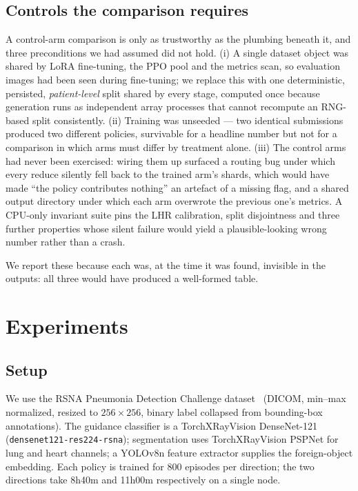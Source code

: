\documentclass[10pt,twocolumn,letterpaper]{article}
\begin{document}
\subsection{Controls the comparison requires}
A control-arm comparison is only as trustworthy as the plumbing beneath
it, and three preconditions we had assumed did not hold. (i) A single
dataset object was shared by LoRA fine-tuning, the PPO pool and the
metrics scan, so evaluation images had been seen during fine-tuning; we
replace this with one deterministic, persisted, \emph{patient-level}
split shared by every stage, computed once because generation runs as
independent array processes that cannot recompute an RNG-based split
consistently. (ii) Training was unseeded --- two identical submissions
produced two different policies, survivable for a headline number but
not for a comparison in which arms must differ by treatment alone.
(iii) The control arms had never been exercised: wiring them up surfaced
a routing bug under which every reduce silently fell back to the trained
arm's shards, which would have made ``the policy contributes nothing''
an artefact of a missing flag, and a shared output directory under which
each arm overwrote the previous one's metrics. A CPU-only invariant
suite pins the LHR calibration, split disjointness and three further
properties whose silent failure would yield a plausible-looking wrong
number rather than a crash.

We report these because each was, at the time it was found, invisible in
the outputs: all three would have produced a well-formed table.

\section{Experiments}
\label{sec:experiments}

\subsection{Setup}
We use the RSNA Pneumonia Detection Challenge dataset~\cite{rsna} (DICOM,
min--max normalized, resized to $256\times256$, binary label collapsed
from bounding-box annotations). The guidance classifier is a
TorchXRayVision DenseNet-121 (\texttt{densenet121-res224-rsna});
segmentation uses TorchXRayVision PSPNet for lung and heart channels; a
YOLOv8n feature extractor supplies the foreign-object embedding. Each
policy is trained for 800 episodes per direction; the two directions
take 8h40m and 11h00m respectively on a single node.
\end{document}

